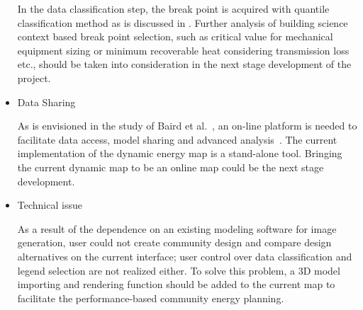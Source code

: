 \begin{itemize}
  In the data classification step, the break point is acquired with
  quantile classification method as is discussed in
  . Further analysis of building science
  context based break point selection, such as critical value for
  mechanical equipment sizing or minimum recoverable heat considering
  transmission loss etc., should be taken into consideration in the
  next stage development of the project.
  
\item Data Sharing
  
  As is envisioned in the study of Baird et al.\ , an on-line platform
  is needed to facilitate data access, model sharing and advanced
  analysis~\cite{baird2014}. The current implementation of the dynamic
  energy map is a stand-alone tool. Bringing the current dynamic map
  to be an online map could be the next stage development.

\item Technical issue

  As a result of the dependence on an existing modeling software for
  image generation, user could not create community design and compare
  design alternatives on the current interface; user control over data
  classification and legend selection are not realized either. To
  solve this problem, a 3D model importing and rendering function
  should be added to the current map to facilitate the
  performance-based community energy planning.

\end{itemize}